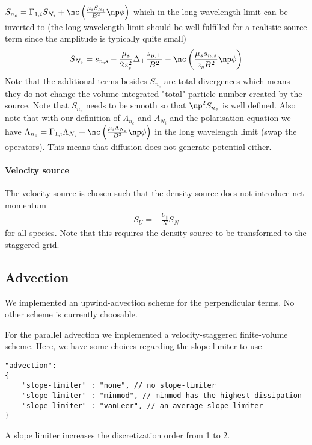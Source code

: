 $S_{n_e} = \Gamma_{1,i}S_{N_i} + \nc\left( \frac{\mu_i S_{N_i}}{B^2}\np
\phi\right)$ which in the long wavelength limit can be inverted to (the long
wavelength limit should be well-fulfilled for a realistic source term since the
amplitude is typically quite small)
\begin{align}
    S_{N_s} = s_{n,s}-\frac{\mu_s }{2z_s^2} \Delta_\perp \frac{s_{p,\perp}}{B^2} -\nc\left( \frac{\mu_s s_{n,s}}{z_sB^2}\np \phi\right)
  \label{eq:ion_source}
\end{align}
Note that the additional terms besides $S_{n_e}$ are total divergences which
means they do not change the volume integrated "total" particle number created
by the source.  Note that $S_{n_e}$ needs to be smooth so that $\np^2 S_{n_e}$
is well defined.  Also note that with our definition of $\Lambda_{n_e}$ and
$\Lambda_{N_i}$ and the polarisation equation we have $\Lambda_{n_e} =
\Gamma_{1,i}\Lambda_{N_i} + \nc\left( \frac{\mu_i \Lambda_{N_i}}{B^2}\np
\phi\right)$ in the long wavelength limit (swap the operators).  This means
that diffusion does not generate potential either.

\paragraph{Velocity source}
The velocity source is chosen such that the density source does not introduce
net momentum
\begin{align}
    S_U = -\frac{U_\parallel}{N} S_N
    \label{eq:velocity_source}
\end{align}
for all species. Note that this requires the density source to be transformed to the staggered grid.

\subsection{Advection}
We implemented an upwind-advection scheme for the perpendicular terms.
No other scheme is currently choosable.

For the parallel advection we implemented a velocity-staggered finite-volume
scheme. Here, we have some choices regarding the slope-limiter to use
\begin{verbatim}
"advection":
{
    "slope-limiter" : "none", // no slope-limiter
    "slope-limiter" : "minmod", // minmod has the highest dissipation
    "slope-limiter" : "vanLeer", // an average slope-limiter
}
\end{verbatim}
\begin{tcolorbox}[title=Note]
    A slope limiter increases the discretization order from 1 to 2.
\end{tcolorbox}
